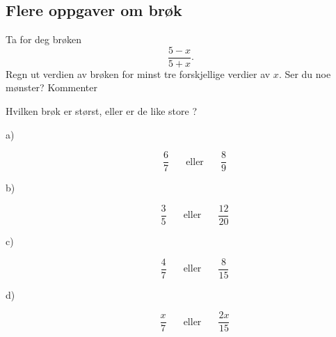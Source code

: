 \documentclass[a4, 11pt, twoside]{article}
\theoremstyle{definition}
\begin{document}
\subsection{Flere oppgaver om brøk}
\begin{Exercise}
Ta for deg brøken \[\frac{5 - x}{5 + x} .\]
Regn ut verdien av brøken for minst tre forskjellige verdier av $x$.
Ser du noe mønster? Kommenter
\end{Exercise}

\begin{Exercise}
Hvilken brøk er størst, eller er de like store ?
\begin{description}
\item[a)] \[\frac{6}{7} \;\;\;\;\;\text{ eller }\;\;\;\;\; \frac{8}{9} \]
\item[b)] \[\frac{3}{5} \;\;\;\;\;\text{ eller }\;\;\;\;\; \frac{12}{20} \]
\item[c)] \[\frac{4}{7} \;\;\;\;\;\text{ eller }\;\;\;\;\; \frac{8}{15} \]
\item[d)] \[\frac{x}{7} \;\;\;\;\;\text{ eller }\;\;\;\;\; \frac{2x}{15} \]
\end{description}
\end{Exercise}
\end{document}
